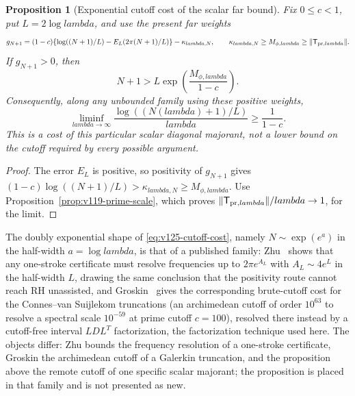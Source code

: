 \documentclass[11pt]{article}
\def\lambda{lambda}%
\newtheorem{proposition}[theorem]{Proposition}
\theoremstyle{remark}
\begin{document}
\begin{proposition}[Exponential cutoff cost of the scalar far bound]
\label{prop:v125-cutoff-cost}
Fix $0\le c<1$, put $L=2\log\lambda$, and use the present far
weights
\[
 g_{N+1}=(1-c)\{\log((N+1)/L)-E_L(2\pi(N+1)/L)\}
               -\kappa_{\lambda,N},
 \qquad \kappa_{\lambda,N}\ge M_{\phi,\lambda}
                    \ge\|\mathsf T_{{\rm pr},\lambda}\|.
\]
If $g_{N+1}>0$, then
\begin{equation}\label{eq:v125-cutoff-cost}
 N+1>L\exp\!\left(\frac{M_{\phi,\lambda}}{1-c}\right).
\end{equation}
Consequently, along any unbounded family using these positive weights,
\[
 \liminf_{\lambda\to\infty}
 \frac{\log((N(\lambda)+1)/L)}{\lambda}\ge\frac1{1-c}.
\]
This is a cost of this particular scalar diagonal majorant, not a
lower bound on the cutoff required by every possible argument.
\end{proposition}
\begin{proof}
The error $E_L$ is positive, so positivity of $g_{N+1}$ gives
$(1-c)\log((N+1)/L)>\kappa_{\lambda,N}\ge M_{\phi,\lambda}$.
Use Proposition~\ref{prop:v119-prime-scale}, which proves
$\|\mathsf T_{{\rm pr},\lambda}\|/\lambda\to1$, for the limit.
\end{proof}

The doubly exponential shape of \eqref{eq:v125-cutoff-cost}, namely
$N\sim\exp(e^{a})$ in the half-width $a=\log\lambda$, is that of a
published family: Zhu~\cite{Zhu2026} shows that any one-stroke
certificate must resolve frequencies up to $2\pi e^{A_L}$ with
$A_L\sim4e^{L}$ in the half-width $L$, drawing the same conclusion that
the positivity route cannot reach RH unassisted, and
Groskin~\cite{Groskin2026} gives the corresponding brute-cutoff cost
for the Connes--van Suijlekom truncations (an archimedean cutoff of
order $10^{63}$ to resolve a spectral scale $10^{-59}$ at prime cutoff
$c=100$), resolved there instead by a cutoff-free interval $LDL^{T}$
factorization, the factorization technique used here.
The objects differ: Zhu bounds the frequency resolution of a
one-stroke certificate, Groskin the archimedean cutoff of a Galerkin
truncation, and the proposition above the remote cutoff of one specific
scalar majorant; the proposition is placed in that family and is not
presented as new.
\end{document}
